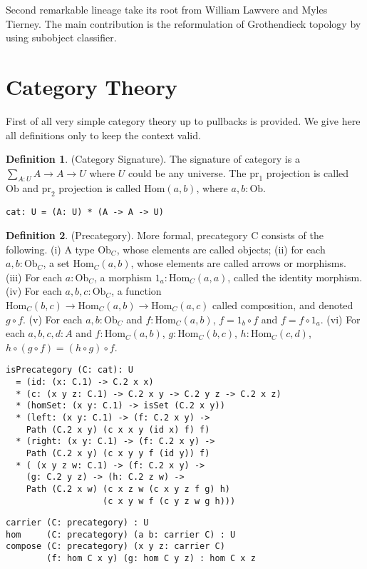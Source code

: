 \documentclass{article}
\theoremstyle{definition}
\newtheorem{definition}{Definition}
\begin{document}
Second remarkable lineage take its root from William Lawvere and
Myles Tierney. The main contribution is the reformulation of Grothendieck topology
by using subobject classifier.

\section{Category Theory}

First of all very simple category theory up to pullbacks is provided. We give here
all definitions only to keep the context valid.

\begin{definition} (Category Signature). The signature of category is
a $\sum_{A:U}A \rightarrow A \rightarrow U$ where $U$ could be any universe.
The $\mathrm{pr}_1$ projection is called $\mathrm{Ob}$ and $\mathrm{pr}_2$ projection is
called $\mathrm{Hom}(a,b)$, where $a,b:\mathrm{Ob}$.
\begin{lstlisting}
cat: U = (A: U) * (A -> A -> U)
\end{lstlisting}
\end{definition}

\begin{definition} (Precategory). More formal, precategory $\mathrm{C}$ consists of the following.
(i) A type $\mathrm{Ob}_C$, whose elements are called objects;
(ii) for each $a,b: \mathrm{Ob}_C$, a set $\mathrm{Hom}_C(a,b)$, whose elements are called arrows or morphisms.
(iii) For each $a: \mathrm{Ob}_C$, a morphism $1_a : \mathrm{Hom}_C(a,a)$, called the identity morphism.
(iv) For each $a,b,c: \mathrm{Ob}_C$, a function
     $\mathrm{Hom}_C(b,c) \rightarrow \mathrm{Hom}_C(a,b) \rightarrow \mathrm{Hom}_C(a,c)$
     called composition, and denoted $g \circ f$.
(v) For each $a,b: \mathrm{Ob}_C$ and $f: \mathrm{Hom}_C(a,b)$, $f = 1_b \circ f$ and $f = f \circ 1_a$.
(vi) For each $a,b,c,d: A$ and $f: \mathrm{Hom}_C(a,b)$, $g: \mathrm{Hom}_C(b,c)$, $h: \mathrm{Hom}_C(c,d)$,
     $h \circ (g \circ f ) = (h \circ g) \circ f$.
\begin{lstlisting}
isPrecategory (C: cat): U
  = (id: (x: C.1) -> C.2 x x)
  * (c: (x y z: C.1) -> C.2 x y -> C.2 y z -> C.2 x z)
  * (homSet: (x y: C.1) -> isSet (C.2 x y))
  * (left: (x y: C.1) -> (f: C.2 x y) ->
    Path (C.2 x y) (c x x y (id x) f) f)
  * (right: (x y: C.1) -> (f: C.2 x y) ->
    Path (C.2 x y) (c x y y f (id y)) f)
  * ( (x y z w: C.1) -> (f: C.2 x y) ->
    (g: C.2 y z) -> (h: C.2 z w) ->
    Path (C.2 x w) (c x z w (c x y z f g) h)
                   (c x y w f (c y z w g h)))
\end{lstlisting}
\begin{lstlisting}
carrier (C: precategory) : U
hom     (C: precategory) (a b: carrier C) : U
compose (C: precategory) (x y z: carrier C)
        (f: hom C x y) (g: hom C y z) : hom C x z
\end{lstlisting}
\end{definition}
\end{document}
